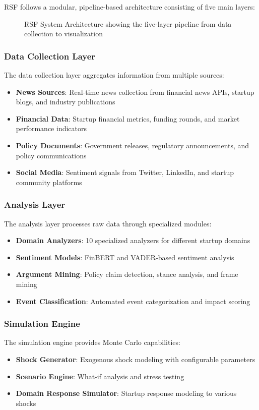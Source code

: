 \documentclass[conference]{IEEEtran}
\begin{document}
RSF follows a modular, pipeline-based architecture consisting of five main layers:

\begin{figure}[H]
\centering
{}
\caption{RSF System Architecture showing the five-layer pipeline from data collection to visualization}
\label{fig:system_architecture}
\end{figure}

\subsubsection{Data Collection Layer}
The data collection layer aggregates information from multiple sources:
\begin{itemize}
    \item \textbf{News Sources}: Real-time news collection from financial news APIs, startup blogs, and industry publications
    \item \textbf{Financial Data}: Startup financial metrics, funding rounds, and market performance indicators
    \item \textbf{Policy Documents}: Government releases, regulatory announcements, and policy communications
    \item \textbf{Social Media}: Sentiment signals from Twitter, LinkedIn, and startup community platforms
\end{itemize}

\subsubsection{Analysis Layer}
The analysis layer processes raw data through specialized modules:
\begin{itemize}
    \item \textbf{Domain Analyzers}: 10 specialized analyzers for different startup domains
    \item \textbf{Sentiment Models}: FinBERT and VADER-based sentiment analysis
    \item \textbf{Argument Mining}: Policy claim detection, stance analysis, and frame mining
    \item \textbf{Event Classification}: Automated event categorization and impact scoring
\end{itemize}

\subsubsection{Simulation Engine}
The simulation engine provides Monte Carlo capabilities:
\begin{itemize}
    \item \textbf{Shock Generator}: Exogenous shock modeling with configurable parameters
    \item \textbf{Scenario Engine}: What-if analysis and stress testing
    \item \textbf{Domain Response Simulator}: Startup response modeling to various shocks
\end{itemize}
\end{document}
